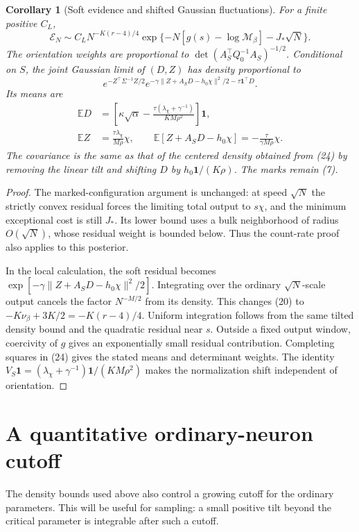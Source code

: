 \documentclass[11pt]{article}
\newtheorem{corollary}[theorem]{Corollary}
\newcommand{\E}{\mathbb E}\newcommand{\R}{\mathbb R}
\newcommand{\one}{\mathbf1}\newcommand{\TV}{\mathrm{TV}}
\begin{document}
\begin{corollary}[Soft evidence and shifted Gaussian fluctuations]
For a finite positive $C_L$,
\[
 \mathcal E_N\sim C_L N^{-K(r-4)/4}
   \exp\{-N[g(s)-\log\mathcal M_\beta]-J_*\sqrt N\}.    \tag{23}
\]
The orientation weights are proportional to
$\det(A_S^\top Q_0^{-1}A_S)^{-1/2}$. Conditional on $S$, the joint
Gaussian limit of $(D,Z)$ has density proportional to
\[
 e^{-Z^\top\Sigma^{-1}Z/2}
 e^{-\gamma\|Z+A_SD-h_0\chi\|^2/2-\tau\one^\top D}.    \tag{24}
\]
Its means are
\begin{align*}
 \E D&=\left[\kappa\sqrt\alpha-
       \frac{\tau(\lambda_\chi+\gamma^{-1})}{KM\rho^2}\right]\one,\\
 \E Z&=\frac{\tau\lambda_\chi}{M\rho}\chi,\qquad
 \E[Z+A_SD-h_0\chi]=-\frac\tau{\gamma M\rho}\chi.
\end{align*}
The covariance is the same as that of the centered density obtained
from (24) by removing the linear tilt and shifting $D$ by
$h_0\one/(K\rho)$. The marks remain (7).
\end{corollary}
\begin{proof}
The marked-configuration argument is unchanged: at speed $\sqrt N$ the
strictly convex residual forces the limiting total output to $s\chi$,
and the minimum exceptional cost is still $J_*$. Its lower bound uses
a bulk neighborhood of radius $O(\sqrt N)$, whose residual weight is
bounded below. Thus the count-rate proof also applies to this posterior.

In the local calculation, the soft residual becomes
$\exp[-\gamma\|Z+A_SD-h_0\chi\|^2/2]$. Integrating over the ordinary
$\sqrt N$-scale output cancels the factor $N^{-M/2}$ from its density.
This changes (20) to $-K\nu_\beta+3K/2=-K(r-4)/4$.
Uniform integration follows from the same tilted density bound and the
quadratic residual near $s$. Outside a fixed output window, coercivity
of $g$ gives an exponentially small residual contribution. Completing
squares in (24) gives the stated means and determinant weights. The
identity $V_S\one=(\lambda_\chi+\gamma^{-1})\one/(KM\rho^2)$ makes
the normalization shift independent of orientation.
\end{proof}

\section{A quantitative ordinary-neuron cutoff}
The density bounds used above also control a growing cutoff for the
ordinary parameters. This will be useful for sampling: a small positive
tilt beyond the critical parameter is integrable after such a cutoff.
\end{document}
